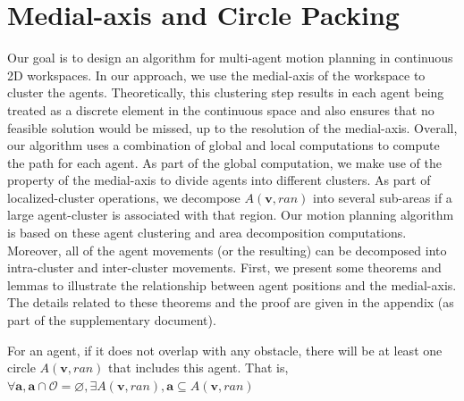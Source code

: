 \section{Medial-axis and Circle Packing}

Our goal is to design an algorithm for multi-agent motion planning in continuous 2D workspaces. 
In our approach, we use the medial-axis of the workspace to cluster the agents.  
Theoretically, this clustering step results in  each agent being treated as a discrete element in the continuous space and also ensures that no feasible solution would be missed, up to the resolution of the medial-axis.
Overall, our algorithm uses a combination of global and local computations to compute the path for each agent.
As part of the global computation, we make use of the property of the medial-axis to divide agents into different clusters. 
As part of localized-cluster operations, we decompose $A(\mathbf v,ran)$ into several sub-areas if a large agent-cluster is associated with that region.
Our motion planning algorithm is based on these agent clustering and area decomposition computations. Moreover, all of the agent movements (or the resulting) can be decomposed into intra-cluster and inter-cluster movements.
First, we present some theorems and lemmas to illustrate the relationship between agent positions and the medial-axis. The details related to these theorems and the proof are given in the appendix (as part of the supplementary document).

\begin{theorem}
For an agent, if it does not overlap with any obstacle, there will be at least one circle $A(\mathbf v,ran)$ that includes this agent. That is, $\forall \mathbf{a}, \mathbf{a} \cap \mathcal{O} = \varnothing, \exists{ A(\mathbf v,ran)}, \mathbf{a} \subseteq  A(\mathbf v,ran)$
\label{thm:included}
\end{theorem}

